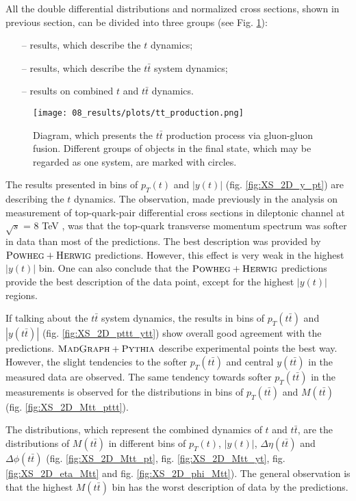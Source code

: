 All the double differential distributions and normalized cross sections, shown in previous section, can be divided into three groups (see Fig. \ref{fig:res_dynamics}):

\begin{itemize}
 \item [--] results, which describe the $t$ dynamics;
 \item [--] results, which describe the $t\bar{t}$ system dynamics;
 \item [--] results on combined $t$  and $t\bar{t}$ dynamics.
\end{itemize}

\begin{figure}[H]
  \centering
  \texttt{[image: 08\_results/plots/tt\_production.png]}
  \caption{Diagram, which presents the $t\bar{t}$ production process via gluon-gluon fusion. Different groups of objects in the final state, which may be regarded
           as one system, are marked with circles.}
  \label{fig:res_dynamics}
\end{figure}

The results presented in bins of $p_{T}(t)$ and $|y(t)|$ (fig. \ref{fig:XS_2D_y_pt}) are describing the $t$
dynamics. The observation, made previously in the analysis on measurement of top-quark-pair differential cross sections in dileptonic channel at 
$\sqrt{s}$ = 8 TeV \cite{Asin2014Auth}, was that the top-quark transverse momentum spectrum was softer in data than most of the predictions. The best
description was provided by $\textsc{Powheg}+\textsc{Herwig}$ predictions. However, this effect is very weak in the highest $|y(t)|$ bin. One can also conclude that the $\textsc{Powheg}+\textsc{Herwig}$
predictions provide the best description of the data point, except for the highest $|y(t)|$ regions.

If talking about the $t\bar{t}$ system dynamics, the results in bins of $p_{T}(t\bar{t})$ and $|y(t\bar{t})|$ (fig. \ref{fig:XS_2D_pttt_ytt})
show overall good agreement with the predictions. $\textsc{MadGraph}+\textsc{Pythia}$ describe experimental points the best way. However, the slight tendencies to the softer $p_{T}(t\bar{t})$
and central $y(t\bar{t})$ in the measured data are observed. The same tendency towards softer $p_{T}(t\bar{t})$ in the measurements is observed for the distributions 
in bins of $p_{T}(t\bar{t})$ and $M(t\bar{t})$ (fig. \ref{fig:XS_2D_Mtt_pttt}).

The distributions, which represent the combined dynamics of $t$ and $t\bar{t}$, are the distributions of $M(t\bar{t})$ in different bins of $p_{T}(t)$, $|y(t)|$,
$\Delta\eta(t\bar{t})$ and $\Delta\phi(t\bar{t})$ (fig. \ref{fig:XS_2D_Mtt_pt}, fig. \ref{fig:XS_2D_Mtt_yt}, fig. \ref{fig:XS_2D_eta_Mtt}
and fig. \ref{fig:XS_2D_phi_Mtt}). The general observation is that the highest $M(t\bar{t})$ bin has the worst description of data by the predictions. 
